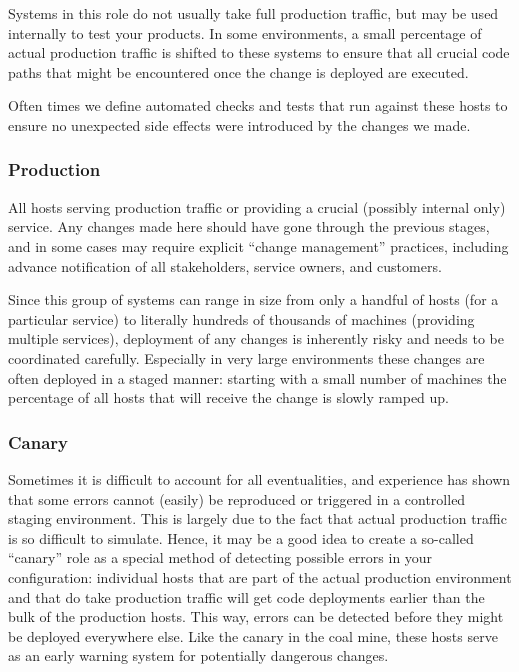Systems in this role do not usually take full
production traffic, but may be used internally to test
your products.  In some environments, a small
percentage of actual production traffic is shifted to
these systems to ensure that all crucial code paths
that might be encountered once the change is deployed
are executed.

Often times we define automated checks and tests that
run against these hosts to ensure no unexpected side
effects were introduced by the changes we made.

\subsubsection*{Production} All hosts serving
production traffic or providing a crucial (possibly
internal only) service.  Any changes made here should
have gone through the previous stages, and in some
cases may require explicit ``change
management'' practices,
including advance notification of all stakeholders,
service owners, and customers.

Since this group of systems can range in size from
only a handful of hosts (for a particular service) to
literally hundreds of thousands of machines (providing
multiple services), deployment of any changes is
inherently risky and needs to be coordinated
carefully.  Especially in very large environments
these changes are often deployed in a staged manner:
starting with a small number of machines the
percentage of all hosts that will receive the change
is slowly ramped up.

\subsubsection*{Canary} Sometimes it is difficult to
account for all eventualities, and experience has
shown that some errors cannot (easily) be reproduced
or triggered in a controlled staging environment.
This is largely due to the fact that actual production
traffic is so difficult to simulate.  Hence, it may be
a good idea to create a so-called ``canary'' role as a
special method of detecting possible errors in your
configuration:  individual hosts that are part of the
actual production environment and that do take
production traffic will get code deployments earlier
than the bulk of the production hosts.  This way,
errors can be detected before they might be deployed
everywhere else.  Like the canary in the coal mine,
these hosts serve as an early warning system for
potentially dangerous changes.

